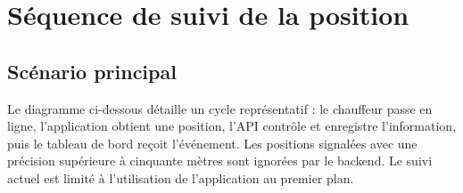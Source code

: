 \documentclass[11pt,a4paper,oneside]{report}
\begin{document}
\chapter{Séquence de suivi de la position}

\section{Scénario principal}

Le diagramme ci-dessous détaille un cycle représentatif : le chauffeur passe
en ligne, l'application obtient une position, l'API contrôle et enregistre
l'information, puis le tableau de bord reçoit l'événement. Les positions
signalées avec une précision supérieure à cinquante mètres sont ignorées par
le backend. Le suivi actuel est limité à l'utilisation de l'application au
premier plan.
\end{document}
